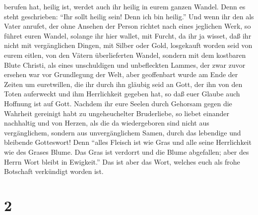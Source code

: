 berufen hat, heilig ist, werdet auch ihr heilig in eurem ganzen Wandel.
 Denn es steht geschrieben: ``Ihr sollt heilig sein! Denn
ich bin heilig.''  Und wenn ihr den als Vater anrufet,
der ohne Ansehen der Person richtet nach eines jeglichen Werk, so führet
euren Wandel, solange ihr hier wallet, mit Furcht,  da
ihr ja wisset, daß ihr nicht mit vergänglichen Dingen, mit Silber oder
Gold, losgekauft worden seid von eurem eitlen, von den Vätern
überlieferten Wandel,  sondern mit dem kostbaren Blute
Christi, als eines unschuldigen und unbefleckten Lammes, 
der zwar zuvor ersehen war vor Grundlegung der Welt, aber geoffenbart
wurde am Ende der Zeiten um euretwillen,  die ihr durch
ihn gläubig seid an Gott, der ihn von den Toten auferweckt und ihm
Herrlichkeit gegeben hat, so daß euer Glaube auch Hoffnung ist auf Gott.
 Nachdem ihr eure Seelen durch Gehorsam gegen die
Wahrheit gereinigt habt zu ungeheuchelter Bruderliebe, so liebet
einander nachhaltig und von Herzen,  als die da
wiedergeboren sind nicht aus vergänglichem, sondern aus unvergänglichem
Samen, durch das lebendige und bleibende Gotteswort! 
Denn ``alles Fleisch ist wie Gras und alle seine Herrlichkeit wie des
Grases Blume. Das Gras ist verdorrt und die Blume abgefallen; aber des
Herrn Wort bleibt in Ewigkeit.''  Das ist aber das Wort,
welches euch als frohe Botschaft verkündigt worden ist.

\hypertarget{section-1}{%
\section{2}\label{section-1}}

